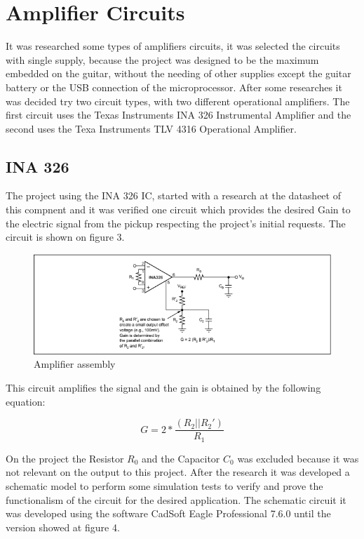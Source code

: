 \chapter{Amplifier Circuits}
It was researched some types of amplifiers circuits, it was selected the circuits
with single supply, because the project was designed to be the maximum embedded
on the guitar, without the needing of other supplies except the guitar battery
or the USB connection of the microprocessor.
After some researches it was decided try two circuit types, with two different
operational amplifiers. The first circuit uses the Texas Instruments INA 326
Instrumental Amplifier and the second uses the Texa Instruments TLV 4316 Operational Amplifier.

\section{INA 326}
The project using the INA 326 IC, started with a research at the datasheet of
this compnent and it was verified one circuit which provides the desired Gain to
the electric signal from the pickup respecting the project's initial requests.
The circuit is shown on figure 3.

\begin{figure}[!htpb]
\centering
\includegraphics[scale=0.8]{images/Texas}
\caption{Amplifier assembly}
\end{figure}

This circuit amplifies the signal and the gain is obtained by the following equation:

$$G=2*\frac{(R_2||R_2 ')}{R_1}$$

On the project the Resistor $R_0$ and the Capacitor $C_0$ was excluded because
it was not relevant on the output to this project. After the research it was
developed a schematic model to perform some simulation tests to verify and prove
the functionalism of the circuit for the desired application. The schematic circuit
it was developed using the software CadSoft Eagle Professional 7.6.0 until the version
showed at figure 4.

